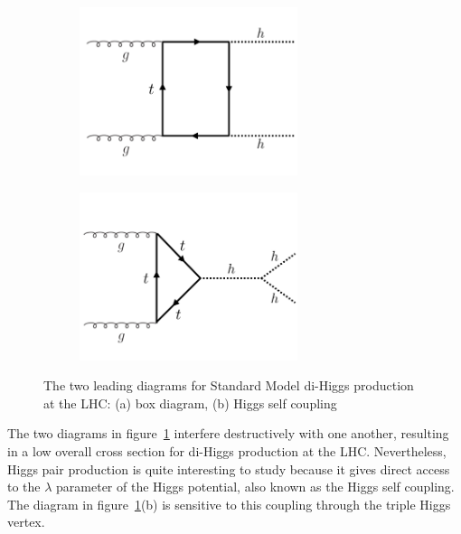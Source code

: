 \begin{figure}[h!]
  \centering
  \captionsetup{justification=centering}

   \begin{subfigure}[t]{0.5\textwidth}
        \centering
        \includegraphics[width=0.7\textwidth]{figures/HH_box}
        \caption{}
    \end{subfigure}%
    \begin{subfigure}[t]{0.5\textwidth}
        \centering
        \includegraphics[width=0.7\textwidth]{figures/HH_lambda}
        \caption{}
    \end{subfigure}
   \caption{The two leading diagrams for Standard Model di-Higgs production at the LHC: (a) box diagram, (b) Higgs self coupling}
  \label{fig:diHiggs}
\end{figure}

The two diagrams in figure~\ref{fig:diHiggs} interfere destructively with one another, resulting in a low overall cross section for di-Higgs production at the LHC. Nevertheless, Higgs pair production is quite interesting to study because it gives direct access to the $\lambda$ parameter of the Higgs potential, also known as the Higgs self coupling. The diagram in figure~\ref{fig:diHiggs}(b) is sensitive to this coupling through the triple Higgs vertex.  

